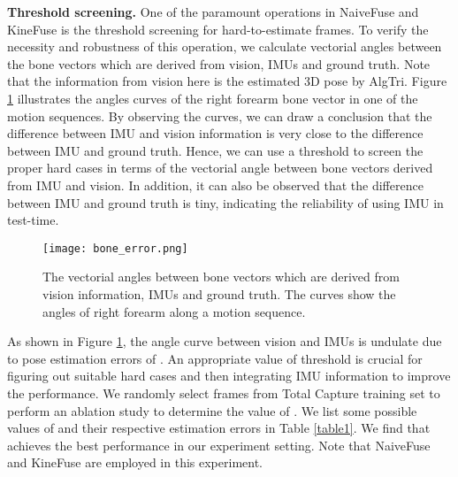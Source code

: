 \documentclass[lettersize,journal]{IEEEtran}
\begin{document}
\noindent \textbf{Threshold screening.}
\quad One of the paramount operations in NaiveFuse and KineFuse is the threshold screening for hard-to-estimate frames. To verify the necessity and robustness of this operation, we calculate vectorial angles between the bone vectors which are derived from vision, IMUs and ground truth. Note that the information from vision here is the estimated 3D pose  by AlgTri. Figure \ref{fig4} illustrates the angles curves of the right forearm bone vector in one of the motion sequences. By observing the curves, we can draw a conclusion that the difference between IMU and vision information is very close to the difference between IMU and ground truth. Hence, we can use a threshold to screen the proper hard cases in terms of the vectorial angle between bone vectors derived from IMU and vision. In addition, it can also be observed that the difference between IMU and ground truth is tiny, indicating the reliability of using IMU in test-time.

\begin{figure}[!tp]
 \begin{center}
 	\centerline{\texttt{[image: bone\_error.png]}}
\caption{The vectorial angles between bone vectors which are derived from vision information, IMUs and ground truth. The curves show the angles of right forearm along a motion sequence.}
\label{fig4}
\end{center}
\end{figure}

As shown in Figure \ref{fig4}, the angle curve between vision and IMUs is undulate due to pose estimation errors of . An appropriate value of threshold  is crucial for figuring out suitable hard cases and then integrating IMU information to improve the performance. We randomly select  frames from Total Capture training set to perform an ablation study to determine the value of . We list some possible values of  and their respective estimation errors in Table \ref{table1}. We find that  achieves the best performance in our experiment setting. Note that NaiveFuse and KineFuse are employed in this experiment.

\begin{table}[!tp]
\caption{Different value of  for methods that apply threshold screening and their respective 3D pose estimation errors (mm) in random selected validation set.}
\begin{center}
\end{center}
\label{table1}
\end{table}
\end{document}
